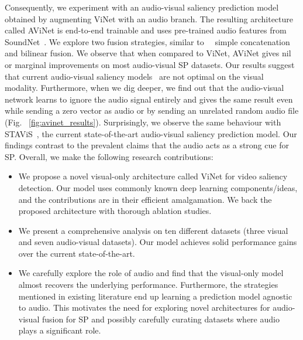 \documentclass[letterpaper, 10 pt, conference]{ieeeconf}  \usepackage{times}
\begin{document}
Consequently, we experiment with an audio-visual saliency prediction model obtained by augmenting ViNet with an audio branch. The resulting architecture called AViNet is end-to-end trainable and uses pre-trained audio features from SoundNet~\cite{aytar2016soundnet}. We explore two fusion strategies, similar to~\cite{tsiami2020stavis, tavakoli2019dave} \ie \ simple concatenation and bilinear fusion. We observe that when compared to ViNet, AViNet gives nil or marginal improvements on most audio-visual SP datasets. Our results suggest that current audio-visual saliency models~\cite{tavakoli2019dave,tsiami2020stavis} are not optimal on the visual modality. Furthermore, when we dig deeper, we find out that the audio-visual network learns to ignore the audio signal entirely and gives the same result even while sending a zero vector as audio or by sending an unrelated random audio file (Fig. ~\ref{fig:avinet_results}). Surprisingly, we observe the same behaviour with STAViS~\cite{tsiami2020stavis}, the current state-of-the-art audio-visual saliency prediction model. Our findings contrast to the prevalent claims that the audio acts as a strong cue for SP. Overall, we make the following research contributions:









\begin{itemize}
    \item We propose a novel visual-only architecture called ViNet for video saliency detection. Our model uses commonly known deep learning components/ideas, and the contributions are in their efficient amalgamation. We back the proposed architecture with thorough ablation studies.
    \item We present a comprehensive analysis on ten different datasets (three visual and seven audio-visual datasets). Our model achieves solid performance gains over the current state-of-the-art.
     \item  We carefully explore the role of audio and find that the visual-only model almost recovers the underlying performance. Furthermore, the strategies mentioned in existing literature end up learning a prediction model agnostic to audio. This motivates the need for exploring novel architectures for audio-visual fusion for SP and possibly carefully curating datasets where audio plays a significant role. 
\end{itemize}
    
\end{document}
